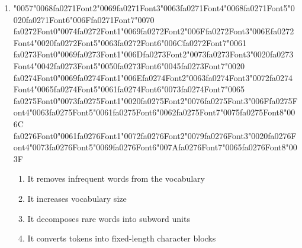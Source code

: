 \documentclass[12pt]{article}
\begin{document}
\begin{enumerate}[label=Q\arabic*.]
 \begin{enumerate}[label=(\Alph*)]
     \item Biased gradient estimates but lower variance
     \item Deterministic updates with faster convergence
     \item Unbiased gradient estimates with higher variance
     \item Smaller parameter magnitudes
 \end{enumerate}
 
 \item {\char"0057}{\char"0068}{\csname fa0271Font2\endcsname\char"0069}{\csname fa0271Font3\endcsname\char"0063}{\csname fa0271Font4\endcsname\char"0068}{\csname fa0271Font5\endcsname\char"0020}{\csname fa0271Font6\endcsname\char"006F}{\csname fa0271Font7\endcsname\char"0070} {\csname fa0272Font0\endcsname\char"0074}{\csname fa0272Font1\endcsname\char"0069}{\csname fa0272Font2\endcsname\char"006F}{\csname fa0272Font3\endcsname\char"006E}{\csname fa0272Font4\endcsname\char"0020}{\csname fa0272Font5\endcsname\char"0063}{\csname fa0272Font6\endcsname\char"006C}{\csname fa0272Font7\endcsname\char"0061} {\csname fa0273Font0\endcsname\char"0069}{\csname fa0273Font1\endcsname\char"006D}{\csname fa0273Font2\endcsname\char"0073}{\csname fa0273Font3\endcsname\char"0020}{\csname fa0273Font4\endcsname\char"0042}{\csname fa0273Font5\endcsname\char"0050}{\csname fa0273Font6\endcsname\char"0045}{\csname fa0273Font7\endcsname\char"0020} {\csname fa0274Font0\endcsname\char"0069}{\csname fa0274Font1\endcsname\char"006E}{\csname fa0274Font2\endcsname\char"0063}{\csname fa0274Font3\endcsname\char"0072}{\csname fa0274Font4\endcsname\char"0065}{\csname fa0274Font5\endcsname\char"0061}{\csname fa0274Font6\endcsname\char"0073}{\csname fa0274Font7\endcsname\char"0065} {\csname fa0275Font0\endcsname\char"0073}{\csname fa0275Font1\endcsname\char"0020}{\csname fa0275Font2\endcsname\char"0076}{\csname fa0275Font3\endcsname\char"006F}{\csname fa0275Font4\endcsname\char"0063}{\csname fa0275Font5\endcsname\char"0061}{\csname fa0275Font6\endcsname\char"0062}{\csname fa0275Font7\endcsname\char"0075}{\csname fa0275Font8\endcsname\char"006C} {\csname fa0276Font0\endcsname\char"0061}{\csname fa0276Font1\endcsname\char"0072}{\csname fa0276Font2\endcsname\char"0079}{\csname fa0276Font3\endcsname\char"0020}{\csname fa0276Font4\endcsname\char"0073}{\csname fa0276Font5\endcsname\char"0069}{\csname fa0276Font6\endcsname\char"007A}{\csname fa0276Font7\endcsname\char"0065}{\csname fa0276Font8\endcsname\char"003F}
 \begin{enumerate}[label=(\Alph*)]
     \item It removes infrequent words from the vocabulary
     \item It increases vocabulary size
     \item It decomposes rare words into subword units
     \item It converts tokens into fixed-length character blocks
 \end{enumerate}
 

\end{enumerate}
\end{document}
